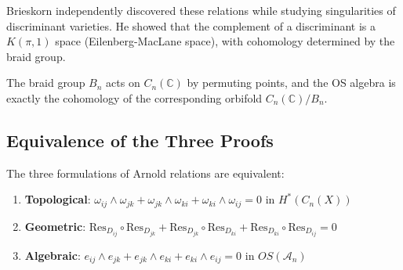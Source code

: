 \begin{remark}
Brieskorn \cite{Brieskorn73} independently discovered these relations while studying 
singularities of discriminant varieties. He showed that the complement of a discriminant 
is a $K(\pi, 1)$ space (Eilenberg-MacLane space), with cohomology determined by the 
braid group.

The braid group $B_n$ acts on $C_n(\mathbb{C})$ by permuting points, and the OS algebra 
is exactly the cohomology of the corresponding orbifold $C_n(\mathbb{C})/B_n$.
\end{remark}

\subsection{Equivalence of the Three Proofs}
\label{sec:arnold-equivalence}

\begin{theorem}
\label{thm:arnold-equivalence-complete}
The three formulations of Arnold relations are equivalent:
\begin{enumerate}
\item \textbf{Topological}: $\omega_{ij} \wedge \omega_{jk} + \omega_{jk} \wedge 
\omega_{ki} + \omega_{ki} \wedge \omega_{ij} = 0$ in $H^*(C_n(X))$
\item \textbf{Geometric}: $\text{Res}_{D_{ij}} \circ \text{Res}_{D_{jk}} + 
\text{Res}_{D_{jk}} \circ \text{Res}_{D_{ki}} + \text{Res}_{D_{ki}} \circ 
\text{Res}_{D_{ij}} = 0$
\item \textbf{Algebraic}: $e_{ij} \wedge e_{jk} + e_{jk} \wedge e_{ki} + e_{ki} 
\wedge e_{ij} = 0$ in $OS(\mathcal{A}_n)$
\end{enumerate}
\end{theorem}

